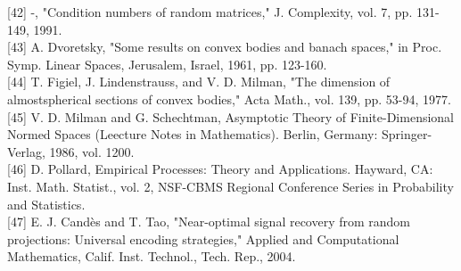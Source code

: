 \documentclass[10pt]{article}
\begin{document}
[42] -, "Condition numbers of random matrices," J. Complexity, vol. 7, pp. 131-149, 1991.\\[0pt]
[43] A. Dvoretsky, "Some results on convex bodies and banach spaces," in Proc. Symp. Linear Spaces, Jerusalem, Israel, 1961, pp. 123-160.\\[0pt]
[44] T. Figiel, J. Lindenstrauss, and V. D. Milman, "The dimension of almostspherical sections of convex bodies," Acta Math., vol. 139, pp. 53-94, 1977.\\[0pt]
[45] V. D. Milman and G. Schechtman, Asymptotic Theory of Finite-Dimensional Normed Spaces (Leecture Notes in Mathematics). Berlin, Germany: Springer-Verlag, 1986, vol. 1200.\\[0pt]
[46] D. Pollard, Empirical Processes: Theory and Applications. Hayward, CA: Inst. Math. Statist., vol. 2, NSF-CBMS Regional Conference Series in Probability and Statistics.\\[0pt]
[47] E. J. Candès and T. Tao, "Near-optimal signal recovery from random projections: Universal encoding strategies," Applied and Computational Mathematics, Calif. Inst. Technol., Tech. Rep., 2004.
\end{document}
